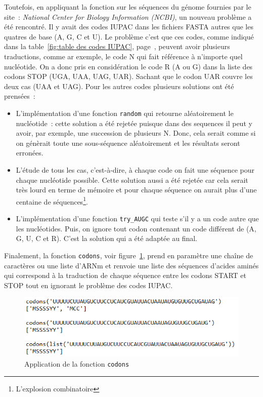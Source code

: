 \documentclass[12pt]{article}
\begin{document}
Toutefois, en appliquant la fonction sur les séquences du génome fournies par le site~: 
\textsl{National Center for Biology Information (NCBI)}, un nouveau problème a été rencontré. Il y avait des codes IUPAC dans les fichiers FASTA autres que les quatres de base (A, G, C et U). Le problème c'est que ces codes, comme indiqué dans la table~\ref{fig:table des codes IUPAC}, page~\pageref{fig:table des codes IUPAC}, peuvent avoir plusieurs traductions, comme ar exemple, le code N qui fait référence à n'importe quel nucléotide. On a donc pris en considération le code R (A ou G) dans la liste des codons STOP (UGA, UAA, UAG, UAR). Sachant que le codon UAR couvre les deux cas (UAA et UAG). 
Pour les autres codes plusieurs solutions ont été prensées~:
\begin{itemize}
\item L'implémentation d'une fonction \texttt{random} qui retourne aléatoirement le nucléotide~: cette solution a été rejetée puisque dans des sequences il peut y avoir, par exemple, une succession de plusieurs N. Donc, cela serait comme si on génèrait toute une sous-séquence aléatoirement et les résultats seront erronées.
\item L'étude de tous les cas, c'est-à-dire, à chaque code on fait une séquence pour chaque nucléotide possible. Cette solution aussi a été rejetée car cela serait très lourd en terme de mémoire et pour chaque séquence on aurait plus d'une centaine de séquences\footnote{L'explosion combinatoire}.
\item L'implémentation d'une fonction \texttt{try\_AUGC} qui teste s'il y a un code autre que les nucléotides. Puis, on ignore tout codon contenant un code différent de (A, G, U, C et R). C'est la solution qui a été adaptée au final. 
\end{itemize}

Finalement, la fonction \texttt{codons}, voir figure~\ref{fig: fctCodons}, prend en paramètre une chaîne de caractères ou une liste d'ARNm et renvoie une liste des séquences d'acides aminés qui correspond à la traduction de chaque séquence entre les codons START et STOP tout en ignorant le problème des codes IUPAC. 

     \begin{figure}[!h]
        \centering
        \includegraphics[scale = 1.2]{Images/Codons/app_codons.png}
        \caption{Application de la fonction \texttt{codons} }
        \label{fig: fctCodons}
    \end{figure}
\end{document}
